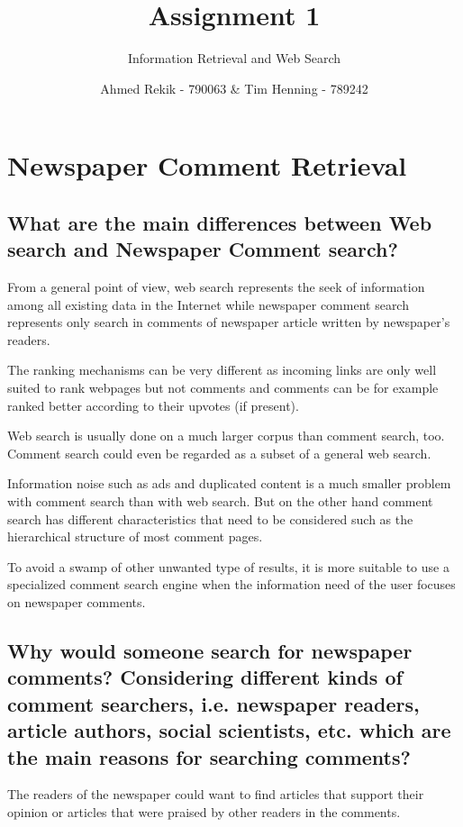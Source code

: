 \documentclass{scrartcl}
\title{Assignment 1}
\subtitle{Information Retrieval and Web Search}
\author{Ahmed Rekik - 790063 \& Tim Henning - 789242}
\begin{document}
\maketitle

\setcounter{section}{1}
\section{Newspaper Comment Retrieval}

\subsection{What are the main differences between Web search and Newspaper Comment search?}

From a general point of view, web search represents the seek of information among all existing data in the Internet while newspaper comment search represents only search in comments of newspaper article written by newspaper's readers.

The ranking mechanisms can be very different as incoming links are only well suited to rank webpages but not comments and comments can be for example ranked better according to their upvotes (if present).

Web search is usually done on a much larger corpus than comment search, too. Comment search could even be regarded as a subset of a general web search.

Information noise such as ads and duplicated content is a much smaller problem with comment search than with web search. But on the other hand comment search has different characteristics that need to be considered such as the hierarchical structure of most comment pages.

To avoid a swamp of other unwanted type of results, it is more suitable to use a specialized comment search engine when the information need of the user focuses on newspaper comments.

\subsection{Why would someone search for newspaper comments? Considering different kinds of comment searchers, i.e. newspaper readers, article authors, social scientists, etc. which are the main reasons for searching comments?}

The readers of the newspaper could want to find articles that support their opinion or articles that were praised by other readers in the comments.
\end{document}
